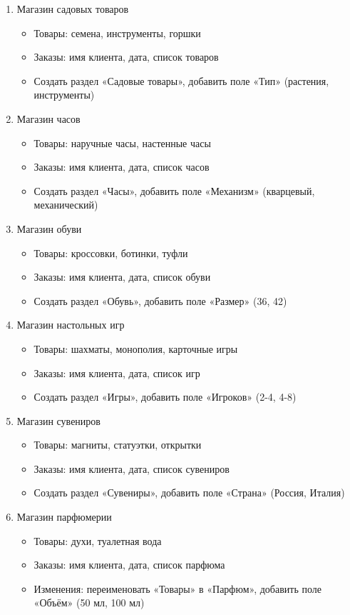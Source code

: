 \documentclass[12pt]{article}
\numberwithin{listing}{section}
\numberwithin{figure}{section}
\begin{document}
\begin{enumerate}
\item Магазин садовых товаров
\begin{itemize}
	\item Товары: семена, инструменты, горшки
	\item Заказы: имя клиента, дата, список товаров
	\item Создать раздел «Садовые товары», добавить поле «Тип» (растения, инструменты)
\end{itemize}

\item Магазин часов
\begin{itemize}
	\item Товары: наручные часы, настенные часы
	\item Заказы: имя клиента, дата, список часов
	\item Создать раздел «Часы», добавить поле «Механизм» (кварцевый, механический)
\end{itemize}

\item Магазин обуви
\begin{itemize}
	\item Товары: кроссовки, ботинки, туфли
	\item Заказы: имя клиента, дата, список обуви
	\item Создать раздел «Обувь», добавить поле «Размер» (36, 42)
\end{itemize}

\item Магазин настольных игр
\begin{itemize}
	\item Товары: шахматы, монополия, карточные игры
	\item Заказы: имя клиента, дата, список игр
	\item Создать раздел «Игры», добавить поле «Игроков» (2-4, 4-8)
\end{itemize}

\item Магазин сувениров
\begin{itemize}
	\item Товары: магниты, статуэтки, открытки
	\item Заказы: имя клиента, дата, список сувениров
	\item Создать раздел «Сувениры», добавить поле «Страна» (Россия, Италия)
\end{itemize}

\newpage

\item Магазин парфюмерии
\begin{itemize}
	\item Товары: духи, туалетная вода
	\item Заказы: имя клиента, дата, список парфюма
	\item Изменения: переименовать «Товары» в «Парфюм», добавить поле «Объём» (50 мл, 100 мл)
\end{itemize}


\end{enumerate}
\end{document}
